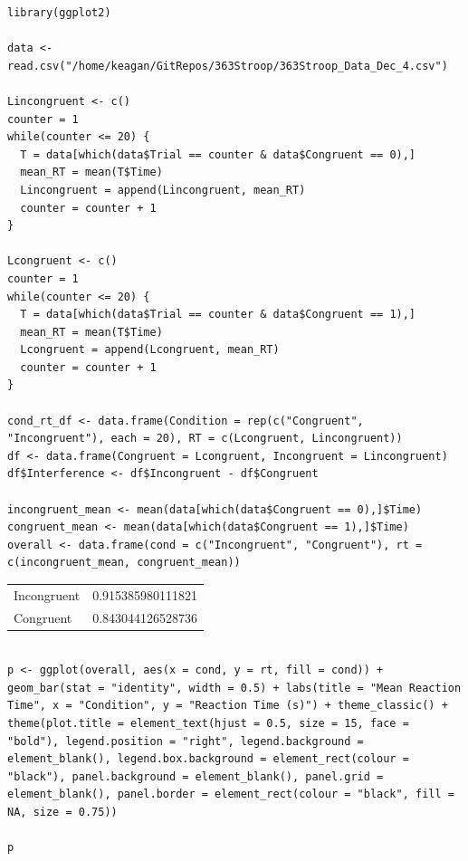 \documentclass{article}
\begin{document}
\begin{verbatim}
library(ggplot2)

data <- read.csv("/home/keagan/GitRepos/363Stroop/363Stroop_Data_Dec_4.csv")

Lincongruent <- c()
counter = 1
while(counter <= 20) {
  T = data[which(data$Trial == counter & data$Congruent == 0),]
  mean_RT = mean(T$Time)
  Lincongruent = append(Lincongruent, mean_RT)
  counter = counter + 1
}

Lcongruent <- c()
counter = 1
while(counter <= 20) {
  T = data[which(data$Trial == counter & data$Congruent == 1),]
  mean_RT = mean(T$Time)
  Lcongruent = append(Lcongruent, mean_RT)
  counter = counter + 1
}

cond_rt_df <- data.frame(Condition = rep(c("Congruent", "Incongruent"), each = 20), RT = c(Lcongruent, Lincongruent))
df <- data.frame(Congruent = Lcongruent, Incongruent = Lincongruent)
df$Interference <- df$Incongruent - df$Congruent

incongruent_mean <- mean(data[which(data$Congruent == 0),]$Time)
congruent_mean <- mean(data[which(data$Congruent == 1),]$Time)
overall <- data.frame(cond = c("Incongruent", "Congruent"), rt = c(incongruent_mean, congruent_mean))

\end{verbatim}

\begin{center}
\begin{tabular}{lr}
Incongruent & 0.915385980111821\\
Congruent & 0.843044126528736\\
\end{tabular}
\end{center}





\begin{verbatim}

p <- ggplot(overall, aes(x = cond, y = rt, fill = cond)) + geom_bar(stat = "identity", width = 0.5) + labs(title = "Mean Reaction Time", x = "Condition", y = "Reaction Time (s)") + theme_classic() + theme(plot.title = element_text(hjust = 0.5, size = 15, face = "bold"), legend.position = "right", legend.background = element_blank(), legend.box.background = element_rect(colour = "black"), panel.background = element_blank(), panel.grid = element_blank(), panel.border = element_rect(colour = "black", fill = NA, size = 0.75))

p

\end{verbatim}
\end{document}

